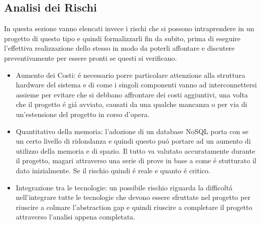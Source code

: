 \subsection{Analisi dei Rischi}

In questa sezione vanno elencati invece i rischi che si possono intraprendere in un progetto di questo tipo e quindi formalizzarli fin da subito, prima di eseguire l'effettiva realizzazione dello stesso in modo da poterli affontare e discutere preventivamente per essere pronti se questi si verificano.

\begin{itemize}
  \item Aumento dei Costi: \'e necessario porre particolare attenzione alla struttura hardware del sistema e di come i singoli componenti vanno ad interconnettersi assieme per evitare che si debbano affrontare dei costi aggiuntivi, una volta che il progetto \'e gi\'a avviato, causati da una qualche mancanza o per via di un'estensione del progetto in corso d'opera.
  \item Quantitativo della memoria: l'adozione di un database NoSQL porta con se un certo livello di ridondanza e quindi questo pu\'o portare ad un aumento di utilizzo della memoria e di spazio. Il tutto va valutato accuratamente durante il progetto, magari attraverso una serie di prove in base a come \'e stutturato il dato inizialmente. Se il rischio quindi \'e reale e quanto \'e critico.
  \item Integrazione tra le tecnologie: un possibile rischio riguarda la difficolt\'a nell'integrare tutte le tecnologie che devono essere sfruttate nel progetto per riuscire a colmare l'abstraction gap e quindi riuscire a completare il progetto attraverso l'analisi appena completata.
\end{itemize}
